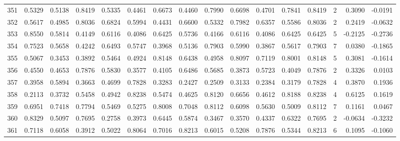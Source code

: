\begin{tabular}{lrrrrrrrrrrrrrrr}
351 &      0.5329 &  0.5138 &  0.8419 &  0.5335 &  0.4461 &  0.6673 &  0.4460 &  0.7990 &  0.6698 &  0.4701 &   0.7841 &     0.8419 &      2 &                    0.3090 &                    -0.0191 \\
352 &      0.5617 &  0.4985 &  0.8036 &  0.6824 &  0.5994 &  0.4431 &  0.6600 &  0.5332 &  0.7982 &  0.6357 &   0.5586 &     0.8036 &      2 &                    0.2419 &                    -0.0632 \\
353 &      0.8550 &  0.5814 &  0.4149 &  0.6116 &  0.4086 &  0.6425 &  0.5736 &  0.4166 &  0.6116 &  0.4086 &   0.6425 &     0.6425 &      5 &                   -0.2125 &                    -0.2736 \\
354 &      0.7523 &  0.5658 &  0.4242 &  0.6493 &  0.5747 &  0.3968 &  0.5136 &  0.7903 &  0.5990 &  0.3867 &   0.5617 &     0.7903 &      7 &                    0.0380 &                    -0.1865 \\
355 &      0.5067 &  0.3453 &  0.3892 &  0.5464 &  0.4924 &  0.8148 &  0.6438 &  0.4958 &  0.8097 &  0.7119 &   0.8001 &     0.8148 &      5 &                    0.3081 &                    -0.1614 \\
356 &      0.4550 &  0.4653 &  0.7876 &  0.5830 &  0.3577 &  0.4105 &  0.6486 &  0.5685 &  0.3873 &  0.5723 &   0.4049 &     0.7876 &      2 &                    0.3326 &                     0.0103 \\
357 &      0.3958 &  0.5894 &  0.3663 &  0.4699 &  0.7828 &  0.3283 &  0.2427 &  0.2509 &  0.3133 &  0.2384 &   0.3179 &     0.7828 &      4 &                    0.3870 &                     0.1936 \\
358 &      0.2113 &  0.3732 &  0.5458 &  0.4942 &  0.8238 &  0.5474 &  0.4625 &  0.8120 &  0.6656 &  0.4612 &   0.8188 &     0.8238 &      4 &                    0.6125 &                     0.1619 \\
359 &      0.6951 &  0.7418 &  0.7794 &  0.5469 &  0.5275 &  0.8008 &  0.7048 &  0.8112 &  0.6098 &  0.5630 &   0.5009 &     0.8112 &      7 &                    0.1161 &                     0.0467 \\
360 &      0.8329 &  0.5097 &  0.7695 &  0.2758 &  0.3973 &  0.6445 &  0.5874 &  0.3467 &  0.3570 &  0.4337 &   0.6322 &     0.7695 &      2 &                   -0.0634 &                    -0.3232 \\
361 &      0.7118 &  0.6058 &  0.3912 &  0.5022 &  0.8064 &  0.7016 &  0.8213 &  0.6015 &  0.5208 &  0.7876 &   0.5344 &     0.8213 &      6 &                    0.1095 &                    -0.1060 \\

\end{tabular}
